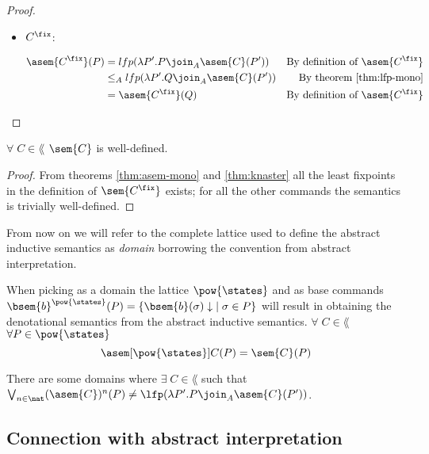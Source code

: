 \begin{proof}
\begin{itemize}
    \item $C^\fix$:

      \begin{align*}
        \asem{C^\fix}(P) 
          &= lfp(\lambda P'. P \join_A \asem{C}(P'))
          &\text{By definition of $\asem{C^\fix}$}\\
          &\leq_A lfp(\lambda P'. Q \join_A \asem{C}(P'))
          &\text{By theorem \ref{thm:lfp-mono}}\\
          &= \asem{C^\fix}(Q) 
          &\text{By definition of $\asem{C^\fix}$}\\
      \end{align*}

  \end{itemize}

\end{proof}


\begin{lemma}
  $\forall \; C \in \lang$ $\sem{C}$ is well-defined.
\end{lemma}
\begin{proof}
  From theorems \ref{thm:asem-mono} and 
  \ref{thm:knaster} all the least fixpoints in the definition of 
  $\sem{C^\fix}$ exists; for all the other commands the semantics is 
  trivially well-defined.
\end{proof}

From now on we will refer to the complete lattice used to define the abstract
inductive semantics as \textit{domain} borrowing the convention from abstract
interpretation.

\begin{observation}
  When picking as a domain the lattice $\pow{\states}$ and as base commands
  $\bsem{b}^{\pow{\states}}(P) = \{ \bsem{b}(\sigma)\downarrow \; \mid \sigma 
  \in P \}$ will result in obtaining the denotational semantics from the 
  abstract inductive semantics. $\forall \; C \in \lang$ $\forall P \in 
  \pow{\states}$ 
  $$\asem[\pow{\states}]{C}(P) = \sem{C}(P)$$
\end{observation}

\begin{observation}
  \label{obs:abstract-fix}
  There are some domains where $\exists \; C \in \lang$ such that
  $\bigvee_{n \in \nat} (\asem{C})^n(P) \neq \lfp(\lambda P'. P \join_A
  \asem{C}(P'))$.
\end{observation}

\subsection{Connection with abstract interpretation}
  
